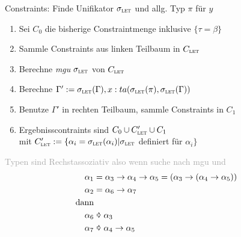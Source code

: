 \documentclass{Zusammenfassung}
\newcommand{\typeRule}[3]{ \textrm{\textsc{#1}}\frac{#2}{#3}}
\newcommand{\E}{\;}
\newcommand{\liin}[2]{#1\E{}#2}
\newcommand{\lii}[2]{(#1\E{}#2)}
\newcommand{\abs}[2]{\lambda{}#1.#2}
\begin{document}
    Constraints: Finde Unifikator $\sigma_\textsc{let}$ und allg. Typ $\pi$ für $y$
    \begin{enumerate}
        \item Sei $C_0$ die bisherige Constraintmenge inklusive $\{\tau=\beta\}$
        \item Sammle Constraints aus linken Teilbaum in $C_\textsc{let}$
        \item Berechne \textit{mgu} $\sigma_\textsc{let}$ von $C_\textsc{let}$
        \item Berechne $\Gamma':=\sigma_\textsc{let}(\Gamma),x:ta(\sigma_\textsc{let}(\pi),\sigma_\textsc{let}(\Gamma))$
        \item Benutze $\Gamma'$ in rechten Teilbaum, sammle Constraints in $C_1$
        \item Ergebnisscontraints sind $C_0\cup{}C'_\textsc{let}\cup{}C_1$\\
        mit $C'_\textsc{let} := \{\alpha_i = \sigma_\textsc{let}(\alpha_i)|\sigma_\textsc{let}$ definiert für $\alpha_i\}$
    \end{enumerate}
    \textcolor{darkgray}{
    Typen sind Rechstassoziativ also wenn suche nach mgu und
    \begin{equation*}
        \begin{aligned}
            \alpha_1&=\alpha_3\rightarrow\alpha_4\rightarrow\alpha_5  = (\alpha_3\rightarrow(\alpha_4\rightarrow\alpha_5))\\
            \alpha_2&=\alpha_6\rightarrow\alpha_7\\
            \text{dann}\\
           \alpha_6&\text{ \pointer\ }\alpha_3\\
            \alpha_7&\text{ \pointer\ }\alpha_4\rightarrow\alpha_5
        \end{aligned}
    \end{equation*}
    }
%
%
\end{document}
